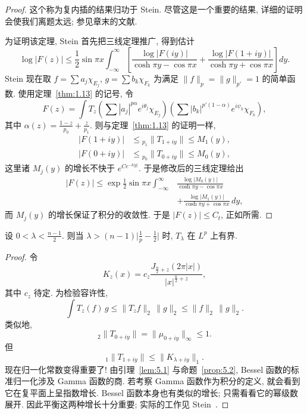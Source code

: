 \begin{proof}
这个称为复内插的结果归功于 Stein. 尽管这是一个重要的结果, 详细的证明会使我们离题太远; 参见章末的文献.

为证明该定理, Stein 首先把三线定理推广, 得到估计
\[
\log|F(z)|\leq\frac{1}{2}\sin\pi x\int_{-\infty}^{\infty}
\left[\frac{\log|F(iy)|}{\cosh\pi y-\cos\pi x}
+\frac{\log|F(1+iy)|}{\cosh\pi y+\cos\pi x}\right]dy.
\]
Stein 现在取 $f=\sum a_j\chi_{E_j}$, $g=\sum b_k\chi_{F_k}$ 为满足 $\|f\|_p=\|g\|_{p'}=1$ 的简单函数. 使用定理~\ref{thm:1.13} 的记号, 令
\[
F(z)=\int T_{z}\left(\sum|a_{j}|^{p\alpha}e^{i\theta_{j}}\chi_{E_{j}}\right)\left(\sum|b_{k}|^{p'(1-\alpha)}e^{i\psi_{k}}\chi_{F_{k}}\right),
\]
其中 $\alpha(z)=\frac{1-z}{p_0}+\frac{z}{p_1}$. 则与定理~\ref{thm:1.13} 的证明一样,
\begin{align*}
|F(1+iy)|&\leq{}_{p_{1}}\|T_{1+iy}\|\leq M_{1}(y), \\
|F(0+iy)|&\leq{}_{p_{0}}\|T_{0+iy}\|\leq M_{0}(y),
\end{align*}
这里诸 $M_j(y)$ 的增长不快于 $e^{Ce^{-b|y|}}$. 于是修改后的三线定理给出
\begin{align*}
|F(z)|\leq\exp\frac{1}{2}\sin\pi x\int_{-\infty}^{\infty}
&\frac{\log\bigl|M_{0}(y)\bigr|}{\cosh\pi y-\cos\pi x} \\
&+\frac{\log\bigl|M_{1}(y)\bigr|}{\cosh\pi y+\cos\pi x}\,dy,
\end{align*}
而 $M_j(y)$ 的增长保证了积分的收敛性. 于是 $|F(z)|\leq C_t$, 正如所需.
\end{proof}

\begin{corollary}\label{cor:5.8}
设 $0<\lambda<\frac{n-1}{2}$. 则当 $\lambda>(n-1)\bigl|\frac{1}{p}-\frac{1}{2}\bigr|$ 时, $T_\lambda$ 在 $L^p$ 上有界.
\end{corollary}

\begin{proof}
令
\[
K_{z}(x)=c_{z}\frac{J_{\frac{n}{2}+z}(2\pi|x|)}{|x|^{\frac{n}{2}+z}},
\]
其中 $c_{z}$ 待定. 为检验容许性,
\[
\int T_{z}(f)\,g\leq\|T_{z}f\|_{2}\,\|g\|_{2}\leq\|f\|_{2}\,\|g\|_{2}.
\]
类似地,
\[
{}_{2}\|T_{0+iy}\|=\|\mu_{0+iy}\|_{\infty}\leq 1.
\]
但
\[
{}_{1}\|T_{1+iy}\|\leq\|K_{\lambda+iy}\|_{1}.
\]
现在归一化常数变得重要了! 由引理~\ref{lem:5.1} 与命题~\ref{prop:5.2}, Bessel 函数的标准归一化涉及 Gamma 函数的商. 若考察 Gamma 函数作为积分的定义, 就会看到它在复平面上呈指数增长. Bessel 函数本身也有类似的增长; 只需看看它的幂级数展开. 因此平衡这两种增长十分重要; 实际的工作见 Stein~\cite{stein-interpolation}.
\end{proof}


